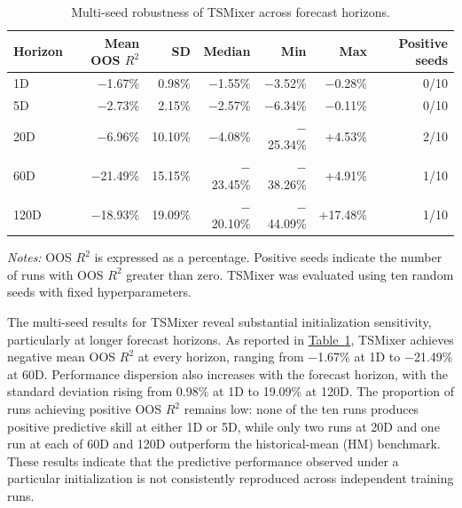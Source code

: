 \documentclass[runningheads,orivec]{llncs}
\begin{document}
\begin{table}[htbp]
\centering
\caption{Multi-seed robustness of TSMixer across forecast horizons.}\label{tab:tsmixer_multiseed}
\setlength{\tabcolsep}{4.5pt}
\begin{tabular}{lrrrrrr}
\hline
Horizon & Mean OOS $R^2$ & SD & Median & Min & Max & Positive seeds \\
\hline
1D   & $-$1.67\%  & 0.98\%  & $-$1.55\%  & $-$3.52\%  & $-$0.28\% & 0/10 \\
5D   & $-$2.73\%  & 2.15\%  & $-$2.57\%  & $-$6.34\%  & $-$0.11\% & 0/10 \\
20D  & $-$6.96\%  & 10.10\% & $-$4.08\%  & $-$25.34\% & +4.53\%   & 2/10 \\
60D  & $-$21.49\% & 15.15\% & $-$23.45\% & $-$38.26\% & +4.91\%   & 1/10 \\
120D & $-$18.93\% & 19.09\% & $-$20.10\% & $-$44.09\% & +17.48\%  & 1/10 \\
\hline
\end{tabular}
\par\vspace{4pt}\parbox{\linewidth}{\scriptsize\textit{Notes:} OOS $R^2$ is expressed as a percentage. Positive seeds indicate the number of runs with OOS $R^2$ greater than zero. TSMixer was evaluated using ten random seeds with fixed hyperparameters.}
\end{table}

The multi-seed results for TSMixer reveal substantial initialization sensitivity, particularly at longer forecast horizons. As reported in \hyperref[tab:tsmixer_multiseed]{Table~\ref*{tab:tsmixer_multiseed}}, TSMixer achieves negative mean OOS $R^2$ at every horizon, ranging from $-$1.67\% at 1D to $-$21.49\% at 60D. Performance dispersion also increases with the forecast horizon, with the standard deviation rising from 0.98\% at 1D to 19.09\% at 120D. The proportion of runs achieving positive OOS $R^2$ remains low: none of the ten runs produces positive predictive skill at either 1D or 5D, while only two runs at 20D and one run at each of 60D and 120D outperform the historical-mean (HM) benchmark. These results indicate that the predictive performance observed under a particular initialization is not consistently reproduced across independent training runs.
\end{document}
